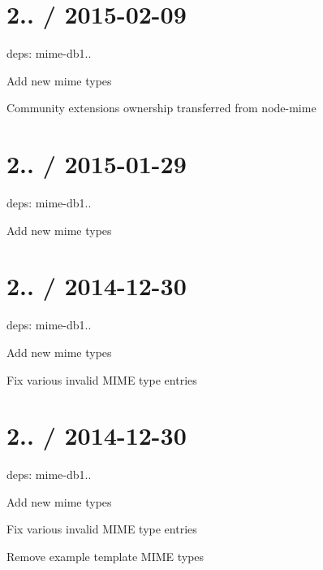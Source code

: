 \section*{2.. / 2015-\/02-\/09 }


\begin{DoxyItemize}
\item deps\+: mime-\/db1..
\begin{DoxyItemize}
\item Add new mime types
\item Community extensions ownership transferred from {\ttfamily node-\/mime}
\end{DoxyItemize}
\end{DoxyItemize}

\section*{2.. / 2015-\/01-\/29 }


\begin{DoxyItemize}
\item deps\+: mime-\/db1..
\begin{DoxyItemize}
\item Add new mime types
\end{DoxyItemize}
\end{DoxyItemize}

\section*{2.. / 2014-\/12-\/30 }


\begin{DoxyItemize}
\item deps\+: mime-\/db1..
\begin{DoxyItemize}
\item Add new mime types
\item Fix various invalid M\+I\+ME type entries
\end{DoxyItemize}
\end{DoxyItemize}

\section*{2.. / 2014-\/12-\/30 }


\begin{DoxyItemize}
\item deps\+: mime-\/db1..
\begin{DoxyItemize}
\item Add new mime types
\item Fix various invalid M\+I\+ME type entries
\item Remove example template M\+I\+ME types
\end{DoxyItemize}
\end{DoxyItemize}

